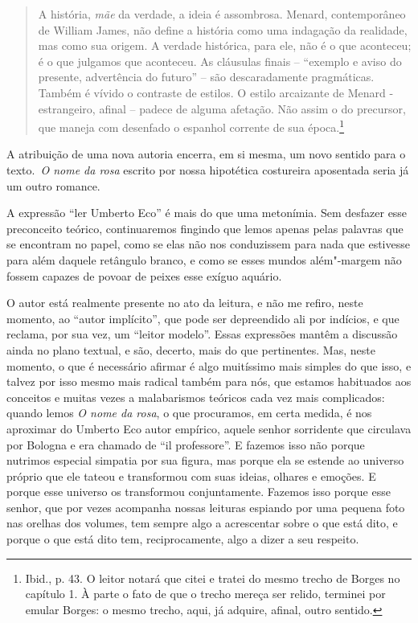 \begin{quote}
A história, \emph{mãe} da verdade, a ideia é assombrosa. Menard,
contemporâneo de William James, não define a história como uma indagação
da realidade, mas como sua origem. A verdade histórica, para ele, não é
o que aconteceu; é o que julgamos que aconteceu. As cláusulas finais --
``exemplo e aviso do presente, advertência do futuro'' -- são
descaradamente pragmáticas. Também é vívido o contraste de estilos. O
estilo arcaizante de Menard - estrangeiro, afinal -- padece de alguma
afetação. Não assim o do precursor, que maneja com desenfado o espanhol
corrente de sua época.\footnote{Ibid., p. 43. O leitor notará que citei
  e tratei do mesmo trecho de Borges no capítulo 1. À parte o fato de
  que o trecho mereça ser relido, terminei por emular Borges: o mesmo
  trecho, aqui, já adquire, afinal, outro sentido.}
\end{quote}

A atribuição de uma nova autoria encerra, em si mesma, um novo sentido
para o texto.~\emph{O nome da rosa} escrito por nossa hipotética
costureira aposentada seria já um outro romance.

A expressão ``ler Umberto Eco'' é mais do que uma metonímia. Sem
desfazer esse preconceito teórico, continuaremos fingindo que lemos
apenas pelas palavras que se encontram no papel, como se elas não nos
conduzissem para nada que estivesse para além daquele retângulo branco,
e como se esses mundos além"-margem não fossem capazes de povoar de
peixes esse exíguo aquário.

O autor está realmente presente no ato da leitura, e não me refiro,
neste momento, ao ``autor implícito'', que pode ser depreendido ali por
indícios, e que reclama, por sua vez, um ``leitor modelo''. Essas
expressões mantêm a discussão ainda no plano textual, e são, decerto,
mais do que pertinentes. Mas, neste momento, o que é necessário afirmar
é algo muitíssimo mais simples do que isso, e talvez por isso mesmo mais
radical também para nós, que estamos habituados aos conceitos e muitas
vezes a malabarismos teóricos cada vez mais complicados: quando lemos
\emph{O nome da rosa}, o que procuramos, em certa medida, é nos
aproximar do Umberto Eco autor empírico, aquele senhor sorridente que
circulava por Bologna e era chamado de ``il professore''. E fazemos isso não
porque nutrimos especial simpatia por sua figura, mas porque ela se
estende ao universo próprio que ele tateou e transformou com suas
ideias, olhares e emoções. E porque esse universo os transformou
conjuntamente. Fazemos isso porque esse senhor, que por vezes acompanha
nossas leituras espiando por uma pequena foto nas orelhas dos volumes,
tem sempre algo a acrescentar sobre o que está dito, e porque o que está
dito tem, reciprocamente, algo a dizer a seu respeito.

